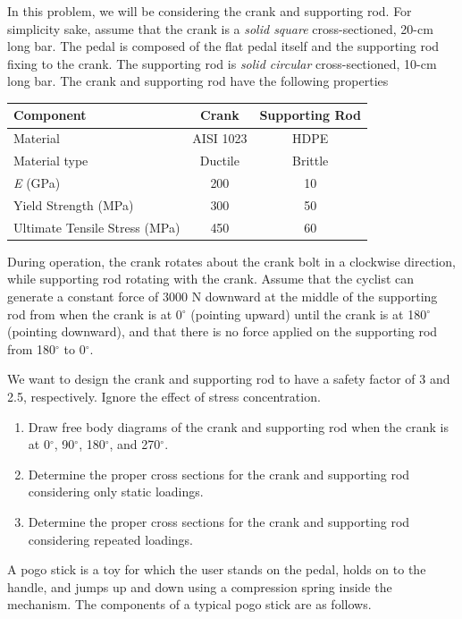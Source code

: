 \documentclass[
10pt,
a4paper,
openany,
svgnames,
]{book}
\newcommand{\exercise}{%
\item \label{lab:\arabic{chapter}.\arabic{exercisesi}}  %
}
\begin{document}
\begin{exercises}
  In this problem, we will be considering the crank and supporting rod. For simplicity sake, assume that the crank is a  \emph{solid square} cross-sectioned, 20-cm long bar. The pedal is composed of the flat pedal itself and the supporting rod fixing to the crank. The supporting rod is \emph{solid circular} cross-sectioned, 10-cm long bar.  The crank and supporting rod have the following properties
  
  \begin{center}
    \begin{tabular}{ l c c }
      \toprule
      Component	&	Crank	&	Supporting Rod \\
      \midrule
      Material	&	AISI 1023	&	HDPE	\\
      Material type & Ductile	&	Brittle \\
      \emph{E} (GPa)	&	200	&	10	\\
      Yield Strength (MPa)	&	300	&	 50	\\
      Ultimate Tensile Stress (MPa)	&	450	&	60	\\
      \bottomrule
    \end{tabular}
  \end{center}
  
  During operation, the crank rotates about the crank bolt in a clockwise direction, while supporting rod rotating with the crank. Assume that the cyclist can generate a constant force of 3000 N downward at the middle of the supporting rod from when the crank is at 0$^{\circ}$ (pointing upward) until the crank is at 180$^{\circ}$ (pointing downward), and that there is no force applied on the supporting rod from 180$^{\circ}$ to 0$^{\circ}$.
  
  We want to design the crank and supporting rod to have a safety factor of 3 and 2.5, respectively. Ignore the effect of stress concentration.
  
  \begin{enumerate}
  \item Draw free body diagrams of the crank and supporting rod when the crank is at 0$^{\circ}$, 90$^{\circ}$, 180$^{\circ}$, and 270$^{\circ}$.
  \item Determine the proper cross sections for the crank and supporting rod considering only static loadings.
  \item Determine the proper cross sections for the crank and supporting rod considering repeated loadings.
  \end{enumerate}

  \exercise A pogo stick is a toy for which the user stands on the pedal, holds on
  to the handle, and jumps up and down using a compression spring inside
  the mechanism. The components of a typical pogo stick are as follows.
  

\end{exercises}
\end{document}
